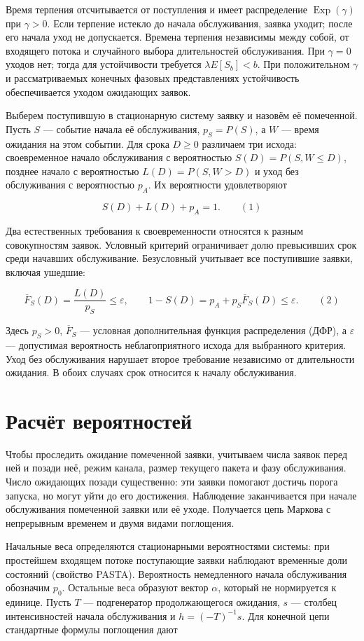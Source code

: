 Время терпения отсчитывается от поступления и имеет распределение $\operatorname{Exp}(\gamma)$ при $\gamma>0$. Если терпение истекло до начала обслуживания, заявка уходит; после его начала уход не допускается. Времена терпения независимы между собой, от входящего потока и случайного выбора длительностей обслуживания. При $\gamma=0$ уходов нет; тогда для устойчивости требуется $\lambda E[S_b]<b$. При положительном $\gamma$ и рассматриваемых конечных фазовых представлениях устойчивость обеспечивается уходом ожидающих заявок.

Выберем поступившую в стационарную систему заявку и назовём её помеченной. Пусть $S$ --- событие начала её обслуживания, $p_S=P(S)$, а $W$ --- время ожидания на этом событии. Для срока $D\geq0$ различаем три исхода: своевременное начало обслуживания с вероятностью $S(D)=P(S,W\leq D)$, позднее начало с вероятностью $L(D)=P(S,W>D)$ и уход без обслуживания с вероятностью $p_A$. Их вероятности удовлетворяют

\[S(D)+L(D)+p_A=1.\qquad (1)\]


Два естественных требования к своевременности относятся к разным совокупностям заявок. Условный критерий ограничивает долю превысивших срок среди начавших обслуживание. Безусловный учитывает все поступившие заявки, включая ушедшие:

\[\overline F_S(D)=\frac{L(D)}{p_S}\leq\varepsilon,
 \qquad 1-S(D)=p_A+p_S\overline F_S(D)\leq\varepsilon.\qquad (2)\]

Здесь $p_S>0$, $\overline F_S$ --- условная дополнительная функция распределения (ДФР), а $\varepsilon$ --- допустимая вероятность неблагоприятного исхода для выбранного критерия. Уход без обслуживания нарушает второе требование независимо от длительности ожидания. В обоих случаях срок относится к началу обслуживания.

\section*{Расчёт вероятностей}

Чтобы проследить ожидание помеченной заявки, учитываем числа заявок перед ней и позади неё, режим канала, размер текущего пакета и фазу обслуживания. Число ожидающих позади существенно: эти заявки помогают достичь порога запуска, но могут уйти до его достижения. Наблюдение заканчивается при начале обслуживания помеченной заявки или её уходе. Получается цепь Маркова с непрерывным временем и двумя видами поглощения.

Начальные веса определяются стационарными вероятностями системы: при простейшем входящем потоке поступающие заявки наблюдают временные доли состояний (свойство PASTA). Вероятность немедленного начала обслуживания обозначим $p_0$. Остальные веса образуют вектор $\alpha$, который не нормируется к единице. Пусть $T$ --- подгенератор продолжающегося ожидания, $s$ --- столбец интенсивностей начала обслуживания и $h=(-T)^{-1}s$. Для конечной цепи стандартные формулы поглощения дают


